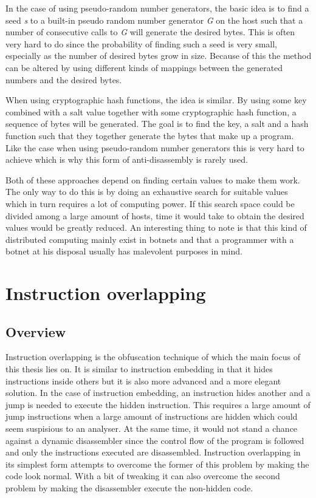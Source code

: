 \documentclass[11pt,twoside]{eitExjobb}
\begin{document}
In the case of using pseudo-random number generators, the basic idea is to find a seed \emph{s} to a built-in pseudo random number generator \emph{G} on the host such that a number of consecutive calls to \emph{G} will generate the desired bytes. This is often very hard to do since the probability of finding such a seed is very small, especially as the number of desired bytes grow in size. Because of this the method can be altered by using different kinds of mappings between the generated numbers and the desired bytes.\cite{prng}

When using cryptographic hash functions, the idea is similar. By using some key combined with a salt value together with some cryptographic hash function, a sequence of bytes will be generated. The goal is to find the key, a salt and a hash function such that they together generate the bytes that make up a program. Like the case when using pseudo-random number generators this is very hard to achieve which is why this form of anti-disassembly is rarely used.\cite{chf}

Both of these approaches depend on finding certain values to make them work. The only way to do this is by doing an exhaustive search for suitable values which in turn requires a lot of computing power. If this search space could be divided among a large amount of hosts, time it would take to obtain the desired values would be greatly reduced. An interesting thing to note is that this kind of distributed computing mainly exist in botnets and that a programmer with a botnet at his disposal usually has malevolent purposes in mind. 


\chapter{Instruction overlapping}
\section{Overview}
Instruction overlapping is the obfuscation technique of which the main focus of this thesis lies on. It is similar to instruction embedding in that it hides instructions inside others but it is also more advanced and a more elegant solution. In the case of instruction embedding, an instruction hides another and a jump is needed to execute the hidden instruction. This requires a large amount of jump instructions when a large amount of instructions are hidden which could seem suspisious to an analyser. At the same time, it would not stand a chance against a dynamic disassembler since the control flow of the program is followed and only the instructions executed are disassembled. Instruction overlapping in its simplest form attempts to overcome the former of this problem by making the code look normal. With a bit of tweaking it can also overcome the second problem by making the disassembler execute the non-hidden code.
\end{document}
